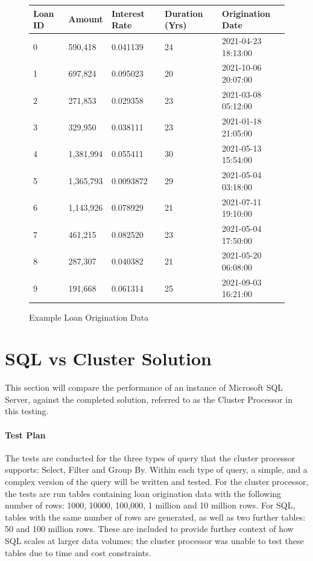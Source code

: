 \begin{figure}[ht]
	\centering
	\begin{tabular}{| l | l | l | l | l |}
		\hline
		\textbf{Loan ID} & \textbf{Amount} & \textbf{Interest Rate} & \textbf{Duration (Yrs)} & \textbf{Origination Date} \\ \hline 
		0 & 590,418 & 0.041139 & 24 & 2021-04-23 18:13:00   \\ \hline
		1 & 697,824 & 0.095023 & 20 & 2021-10-06 20:07:00    \\ \hline
		2 & 271,853 & 0.029358 & 23 & 2021-03-08 05:12:00    \\ \hline
		3 & 329,950 & 0.038111 & 23 & 2021-01-18 21:05:00    \\ \hline
		4 & 1,381,994 & 0.055411 & 30 & 2021-05-13 15:54:00  \\ \hline
		5 & 1,365,793 & 0.0093872 & 29 & 2021-05-04 03:18:00  \\ \hline
		6 & 1,143,926 & 0.078929 & 21 & 2021-07-11 19:10:00   \\ \hline
		7 & 461,215 & 0.082520 & 23 & 2021-05-04 17:50:00    \\ \hline
		8 & 287,307 & 0.040382 & 21 & 2021-05-20 06:08:00   \\ \hline
		9 & 191,668 & 0.061314 & 25 & 2021-09-03 16:21:00    \\ \hline
	\end{tabular}
	\caption{Example Loan Origination Data}
	\label{fig:fake-loan-data}
\end{figure}

\section{SQL vs Cluster Solution}
This section will compare the performance of an instance of Microsoft SQL Server, against the completed solution, referred to as the Cluster Processor in this testing. 

\paragraph{Test Plan}
The tests are conducted for the three types of query that the cluster processor supports: Select, Filter and Group By. Within each type of query, a simple, and a complex version of the query will be written and tested. For the cluster processor, the tests are run tables containing loan origination data with the following number of rows: 1000, 10000, 100,000, 1 million and 10 million rows. For SQL, tables with the same number of rows are generated, as well as two further tables: 50 and 100 million rows. These are included to provide further context of how SQL scales at larger data volumes; the cluster processor was unable to test these tables due to time and cost constraints.

